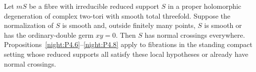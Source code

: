 \begin{proposition}\hypertarget{tag-02WS}{}\label{night:P4.20}\label{stmt:P4.20}

Let $mS$ be a fibre with irreducible reduced support $S$ in a proper
holomorphic degeneration of complex two-tori with smooth total threefold.
Suppose the normalization of $S$ is smooth and, outside
finitely many points, $S$ is smooth or has the ordinary-double
germ $xy=0$. Then $S$ has normal crossings everywhere.
Propositions~\ref{night:P4.6}--\ref{night:P4.8} apply to
fibrations in the standing compact setting whose reduced supports
all satisfy these local hypotheses or already have normal crossings.
\end{proposition}
